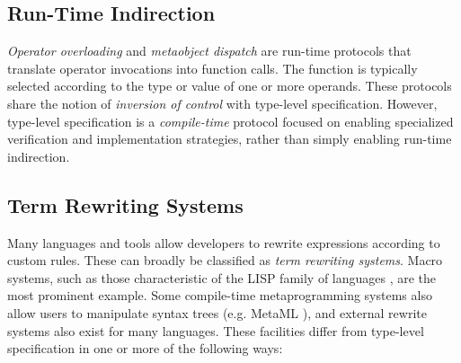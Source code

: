 \documentclass{sig-alternate}
\begin{document}
\subsection{Run-Time Indirection}
{\it Operator overloading} \cite{vanWijngaarden:Mailloux:Peck:Koster:Sintzoff:Lindsey:Meertens:Fisker:acta:1975} and {\it metaobject dispatch} \cite{Kiczales91} are run-time protocols that translate operator invocations into function calls. The function is typically selected according to the type or value of one or more operands. These protocols share the notion of {\it inversion of control} with type-level specification. However, type-level specification is a {\it compile-time} protocol focused on enabling specialized verification and implementation strategies, rather than simply enabling run-time indirection.

\subsection{Term Rewriting Systems}
Many languages and tools allow developers to rewrite expressions according to custom rules. These can broadly be classified as {\it term rewriting systems}. Macro systems, such as those characteristic of the LISP family of languages \cite{mccarthy1978history}, are the most prominent example. Some compile-time metaprogramming systems also allow users to manipulate syntax trees (e.g. MetaML \cite{Sheard:1999:UMS}), and external rewrite systems also exist for many languages.
These facilities differ from type-level specification in one or more of the following ways:
\end{document}
